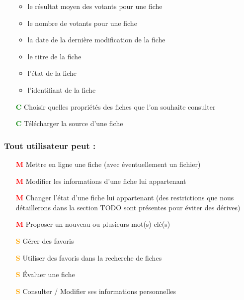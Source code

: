 \begin{itemize}
            \begin{itemize}
            \item le résultat moyen des votants pour une \gls{fiche}
            \item le nombre de votants pour une \gls{fiche}
            \item la date de la dernière modification de la \gls{fiche}
            \item le titre de la \gls{fiche}
            \item l'état de la \gls{fiche}
            \item l'identifiant de la \gls{fiche}
        \end{itemize}
    \item[\textcolor{green}{\textbf{C}}] Choisir quelles propriétés des \glspl{fiche} que l'on souhaite consulter
    \item[\textcolor{green}{\textbf{C}}] Télécharger la source d'une \gls{fiche} 
\end{itemize}

\subsubsection*{Tout utilisateur peut : }
\begin{itemize}
    \item[\textcolor{red}{\textbf{M}}] Mettre en ligne une \gls{fiche}  (avec éventuellement un fichier)
    \item[\textcolor{red}{\textbf{M}}] Modifier les informations d'une \gls{fiche}  lui appartenant
    \item[\textcolor{red}{\textbf{M}}] Changer l'état d'une \gls{fiche} lui appartenant (des restrictions que nous détaillerons dans la section TODO sont présentes pour éviter des dérives)
    \item[\textcolor{red}{\textbf{M}}] Proposer un nouveau ou plusieurs mot(s) clé(s)
    \item[\textcolor{orange}{\textbf{S}}] Gérer des favoris
    \item[\textcolor{orange}{\textbf{S}}] Utiliser des favoris dans la recherche de \gls{fiche}s
    \item[\textcolor{orange}{\textbf{S}}] Évaluer une \gls{fiche}  
    \item[\textcolor{orange}{\textbf{S}}] Consulter / Modifier ses informations personnelles
\end{itemize}


